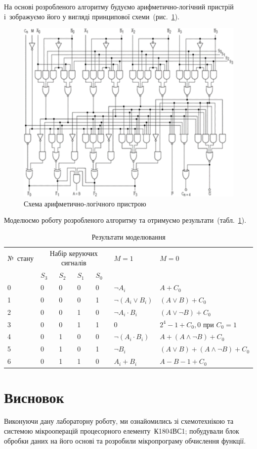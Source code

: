 \documentclass[a4paper,oneside,DIV=12,12pt,headings=normal]{scrartcl}
\begin{document}
		На основі розробленого алгоритму будуємо арифметично-логічний пристрій і~зображуємо його у вигляді принципової схеми~(рис.~\ref{fig:alu}).
		\begin{figure}[!htbp]
		\centering
			\includegraphics[height = 15\baselineskip]{./assets/01.png}
		\caption{Схема арифметично-логічного пристрою}
		\label{fig:alu}
		\end{figure}
		
		Моделюємо роботу розробленого алгоритму та отримуємо результати~(табл.~\ref{tab:results}).
		
		\begin{table}[!htbp]
		\centering
			\begin{tabular}{lb{2.5em}b{2.5em}b{2.5em}b{2.5em}ll}
				\toprule
					№~стану & \multicolumn{4}{c}{Набір керуючих сигналів} & $M = 1$ & $M = 0$ \\
					\cmidrule(lr){2-5}
					 & $S_3$ & $S_2$ & $S_1$ & $S_0$ & & \\
				\midrule
					0 & 0 & 0 & 0 & 0 & $\neg A_i$ & $A + C_0$ \\
					1 & 0 & 0 & 0 & 1 & $\neg (A_i \lor B_i)$ & $(A \lor B) + C_0$ \\
					2 & 0 & 0 & 1 & 0 & $\neg A_i \cdot B_i$ & $(A \lor \neg B) + C_0$ \\
					3 & 0 & 0 & 1 & 1 & $0$ & $2^4 - 1 + C_0, 0 \text{ при } C_0 = 1$ \\
					4 & 0 & 1 & 0 & 0 & $\neg (A_i \cdot B_i)$ & $A + (A \land \neg B) + C_0$ \\
					5 & 0 & 1 & 0 & 1 & $\neg B_i$ & $(A \lor B) + (A \land \neg B) + C_0$ \\
					6 & 0 & 1 & 1 & 0 & $A_i + B_i$ & $A - B - 1 + C_0$ \\
				\bottomrule
			\end{tabular}
		\caption{Результати моделювання}
		\label{tab:results}
		\end{table}
		
	\section{Висновок}
		Виконуючи дану лабораторну роботу, ми ознайомились зі схемотехнікою та системою мікрооперацій процесорного елементу~К1804ВС1; побудували блок обробки даних на його основі та розробили мікропрограму обчислення функції.
\end{document}
